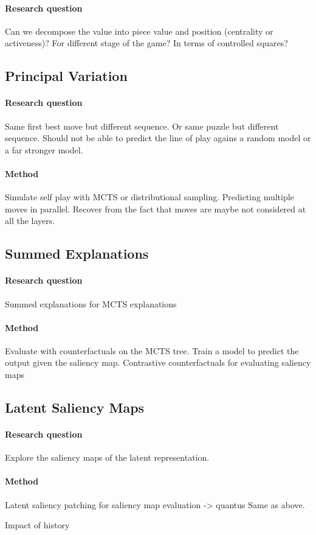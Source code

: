 \paragraph{Research question} Can we decompose the value into piece value and position (centrality or activeness)? For different stage of the game? In terms of controlled squares?

\subsection{Principal Variation}
\paragraph{Research question}
Same first best move but different sequence. Or same puzzle but different sequence. Should not be able to predict the line of play agains a random model or a far stronger model.
\paragraph{Method}
Simulate self play with MCTS or distributional sampling.
Predicting multiple moves in parallel. Recover from the fact that moves are maybe not considered at all the layers.

\subsection{Summed Explanations}
\paragraph{Research question}
Summed explanations for MCTS explanations
\paragraph{Method}
Evaluate with counterfactuals on the MCTS tree.
Train a model to predict the output given the saliency map.
Contrastive counterfactuals for evaluating saliency maps

\subsection{Latent Saliency Maps}
\paragraph{Research question}
Explore the saliency maps of the latent representation.
\paragraph{Method}
Latent saliency patching for saliency map evaluation -> quantus
Same as above.


Impact of history
